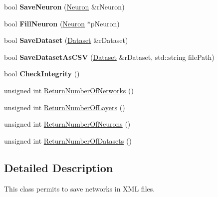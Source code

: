 \begin{DoxyCompactItemize}
\item 
\hypertarget{classneuroc_1_1_parser_a5a3d8803f938a5835110bae36ed9eb0a}{bool {\bfseries Save\-Neuron} (\hyperlink{classneuroc_1_1_neuron}{Neuron} \&r\-Neuron)}\label{classneuroc_1_1_parser_a5a3d8803f938a5835110bae36ed9eb0a}

\item 
\hypertarget{classneuroc_1_1_parser_af4212e1aad972d5111b314da2308edf6}{bool {\bfseries Fill\-Neuron} (\hyperlink{classneuroc_1_1_neuron}{Neuron} $\ast$p\-Neuron)}\label{classneuroc_1_1_parser_af4212e1aad972d5111b314da2308edf6}

\item 
\hypertarget{classneuroc_1_1_parser_ab607fbc5149fa1ba8de4ec54d8457642}{bool {\bfseries Save\-Dataset} (\hyperlink{classneuroc_1_1_dataset}{Dataset} \&r\-Dataset)}\label{classneuroc_1_1_parser_ab607fbc5149fa1ba8de4ec54d8457642}

\item 
\hypertarget{classneuroc_1_1_parser_a533d7a747570418461e3d258d2c73bdc}{bool {\bfseries Save\-Dataset\-As\-C\-S\-V} (\hyperlink{classneuroc_1_1_dataset}{Dataset} \&r\-Dataset, std\-::string file\-Path)}\label{classneuroc_1_1_parser_a533d7a747570418461e3d258d2c73bdc}

\item 
\hypertarget{classneuroc_1_1_parser_af47cbb4d40a2f68474e8da5da0f4a8f6}{bool {\bfseries Check\-Integrity} ()}\label{classneuroc_1_1_parser_af47cbb4d40a2f68474e8da5da0f4a8f6}

\item 
unsigned int \hyperlink{classneuroc_1_1_parser_ad1bbc7823d25f072816cf2785c37143f}{Return\-Number\-Of\-Networks} ()
\item 
unsigned int \hyperlink{classneuroc_1_1_parser_a87f627ea371f74ec2a559e7038231160}{Return\-Number\-Of\-Layers} ()
\item 
unsigned int \hyperlink{classneuroc_1_1_parser_a3cb0890dfcfc3c3a9d41b5a797a1269b}{Return\-Number\-Of\-Neurons} ()
\item 
unsigned int \hyperlink{classneuroc_1_1_parser_ab4b30e5ac79d94eb5afab500e5da8053}{Return\-Number\-Of\-Datasets} ()
\end{DoxyCompactItemize}


\subsection{Detailed Description}
This class permits to save networks in X\-M\-L files. 

